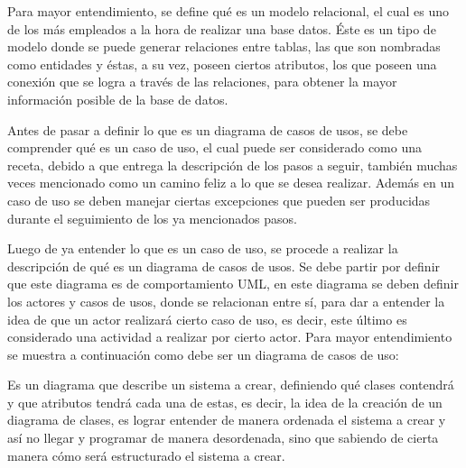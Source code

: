 \documentclass{memoria}
\begin{document}
Para mayor entendimiento, se define qué es un modelo relacional, el cual es uno de los más empleados a la hora de realizar una base datos. Éste es un tipo de modelo donde se puede generar relaciones entre tablas, las que son nombradas como entidades y éstas, a su vez, poseen ciertos atributos, los que poseen una conexión que se logra a través de las relaciones, para obtener la mayor información posible de la base de datos.\\


Antes de pasar a definir lo que es un diagrama de casos de usos, se debe comprender qué es un caso de uso, el cual puede ser considerado como una receta, debido a que entrega la descripción de los pasos a seguir, también muchas veces mencionado como un camino feliz a lo que se desea realizar. Además en un caso de uso se deben manejar ciertas excepciones que pueden ser producidas durante el seguimiento de los ya mencionados pasos.

Luego de ya entender lo que es un caso de uso, se procede a realizar la descripción de qué es un diagrama de casos de usos. Se debe partir por definir que este diagrama es de comportamiento UML, en este diagrama se deben definir los actores y casos de usos, donde se relacionan entre sí, para dar a entender la idea de que un actor realizará cierto caso de uso, es decir, este último es considerado una actividad a realizar por cierto actor. Para mayor entendimiento se muestra a continuación como debe ser un diagrama de casos de uso:\\



 

Es un diagrama que describe un sistema a crear, definiendo qué clases contendrá y que atributos tendrá cada una de estas, es decir, la idea de la creación de un diagrama de clases, es lograr entender de manera ordenada el sistema a crear y así no llegar y programar de manera desordenada, sino que sabiendo de cierta manera cómo será estructurado el sistema a crear.\\
\end{document}
